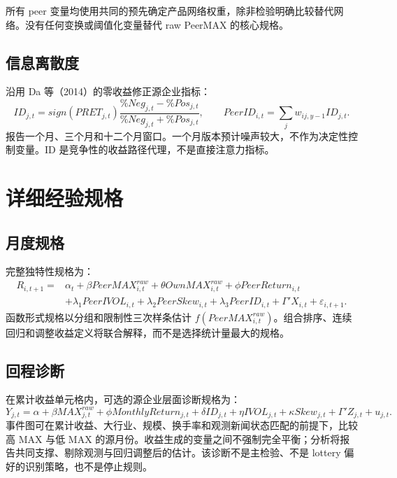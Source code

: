 \documentclass[UTF8,a4paper,11pt]{ctexart}
\begin{document}
所有 peer 变量均使用共同的预先确定产品网络权重，除非检验明确比较替代网络。没有任何变换或阈值化变量替代 raw PeerMAX 的核心规格。

\subsection{信息离散度}
沿用 Da 等（2014）的零收益修正源企业指标：
\begin{equation}
ID_{j,t}=sign(PRET_{j,t})\frac{\%Neg_{j,t}-\%Pos_{j,t}}
{\%Neg_{j,t}+\%Pos_{j,t}},\qquad
PeerID_{i,t}=\sum_jw_{ij,y-1}ID_{j,t}.
\end{equation}
报告一个月、三个月和十二个月窗口。一个月版本预计噪声较大，不作为决定性控制变量。ID 是竞争性的收益路径代理，不是直接注意力指标。

\section{详细经验规格}
\subsection{月度规格}
完整独特性规格为：
\begin{equation}
\begin{aligned}
R_{i,t+1}={}&\alpha_t+\beta PeerMAX^{raw}_{i,t}+\theta OwnMAX^{raw}_{i,t}
+\phi PeerReturn_{i,t}\\
&+\lambda_1PeerIVOL_{i,t}+\lambda_2PeerSkew_{i,t}
+\lambda_3PeerID_{i,t}+\Gamma'X_{i,t}+\varepsilon_{i,t+1}.
\end{aligned}
\end{equation}
函数形式规格以分组和限制性三次样条估计 $f(PeerMAX^{raw}_{i,t})$。组合排序、连续回归和调整收益定义将联合解释，而不是选择统计量最大的规格。

\subsection{回程诊断}
在累计收益单元格内，可选的源企业层面诊断规格为：
\begin{equation}
Y_{j,t}=\alpha+\beta MAX^{raw}_{j,t}+\phi MonthlyReturn_{j,t}
+\delta ID_{j,t}+\eta IVOL_{j,t}+\kappa Skew_{j,t}+\Gamma'Z_{j,t}+u_{j,t}.
\end{equation}
事件图可在累计收益、大行业、规模、换手率和观测新闻状态匹配的前提下，比较高 MAX 与低 MAX 的源月份。收益生成的变量之间不强制完全平衡；分析将报告共同支撑、剔除观测与回归调整后的估计。该诊断不是主检验、不是 lottery 偏好的识别策略，也不是停止规则。
\end{document}
